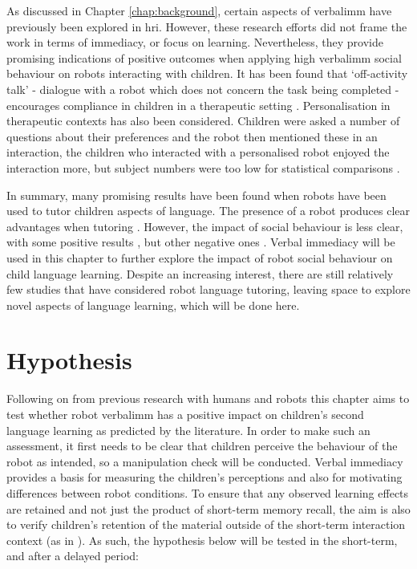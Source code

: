 As discussed in Chapter \ref{chap:background}, certain aspects of \gls{verbalimm} have previously been explored in \acrshort{hri}. However, these research efforts did not frame the work in terms of immediacy, or focus on learning. Nevertheless, they provide promising indications of positive outcomes when applying high \gls{verbalimm} social behaviour on robots interacting with children. It has been found that `off-activity talk' - dialogue with a robot which does not concern the task being completed - encourages compliance in children in a therapeutic setting \citep{kruijff2014oat}. Personalisation in therapeutic contexts has also been considered. Children were asked a number of questions about their preferences and the robot then mentioned these in an interaction, the children who interacted with a personalised robot enjoyed the interaction more, but subject numbers were too low for statistical comparisons \citep{henkemans2013using}.

In summary, many promising results have been found when robots have been used to tutor children aspects of language. The presence of a robot produces clear advantages when tutoring \citep{alemi2014employing,kanda2004interactive,tanaka2012children}. However, the impact of social behaviour is less clear, with some positive results \citep{saerbeck2010expressive}, but other negative ones \citep{herberg2015robot}. Verbal immediacy will be used in this chapter to further explore the impact of robot social behaviour on child language learning. Despite an increasing interest, there are still relatively few studies that have considered robot language tutoring, leaving space to explore novel aspects of language learning, which will be done here.

\section{Hypothesis}\label{sec:verbal-hyp}
Following on from previous research with humans \citep{gorham1988relationship} and robots \citep{henkemans2013using,kruijff2014oat} this chapter aims to test whether robot \gls{verbalimm} has a positive impact on children's second language learning as predicted by the literature. In order to make such an assessment, it first needs to be clear that children perceive the behaviour of the robot as intended, so a manipulation check will be conducted. Verbal immediacy provides a basis for measuring the children's perceptions and also for motivating differences between robot conditions. To ensure that any observed \gls{learning} effects are retained and not just the product of short-term memory recall, the aim is also to verify children's retention of the material outside of the short-term interaction context (as in \citealt{tanaka2012children}). As such, the hypothesis below will be tested in the short-term, and after a delayed period:

